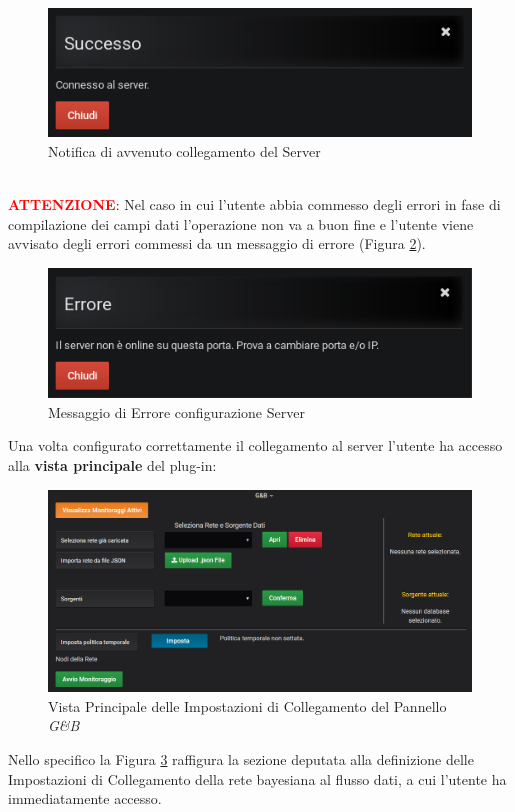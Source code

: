 \begin{figure}[H]
	\begin{center}
		\includegraphics[scale=0.6]{./images/NotificaServer.png}
		 \caption{Notifica di avvenuto collegamento del Server}	
		 \label{NotificaServer}
	\end{center}
\end{figure}

~\\
\textbf{\textcolor{red}{ATTENZIONE}}: Nel caso in cui l'utente abbia commesso degli errori in fase di compilazione dei campi dati l'operazione non va a buon fine e l'utente viene avvisato degli errori commessi da un messaggio di errore (Figura \ref{ErroreServer}).

\begin{figure}[H]
	\begin{center}
		\includegraphics[scale=0.6]{./images/ErroreServer.png}
		 \caption{Messaggio di Errore configurazione Server}	
		 \label{ErroreServer}
	\end{center}
\end{figure}


Una volta configurato correttamente il collegamento al server l'utente ha accesso alla \textbf{vista principale} del plug-in:
\begin{figure}[H]
	\begin{center}
		\includegraphics[scale=0.6]{./images/Panel.png}
		 \caption{Vista Principale delle Impostazioni di Collegamento del Pannello \textit{G\&B}}	
		 \label{Pannello}
	\end{center}
\end{figure}

Nello specifico la Figura \ref{Pannello} raffigura la sezione deputata alla definizione delle Impostazioni di Collegamento della rete bayesiana al flusso dati, a cui l'utente ha immediatamente accesso.
